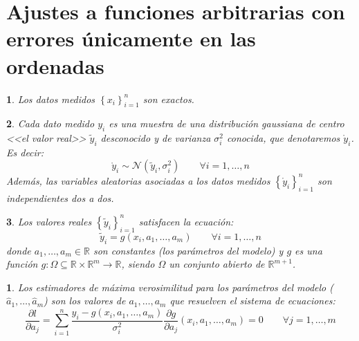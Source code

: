 \documentclass[11pt,a4paper,spanish]{article}
\numberwithin{equation}{section}
\numberwithin{table}{section}
\numberwithin{figure}{section}
\theoremstyle{definition}
\theoremstyle{remark}
\theoremstyle{definition}
\theoremstyle{remark}
\theoremstyle{plain}
\newtheorem{prop}{\protect\propositionname}[section]
\theoremstyle{plain}
\theoremstyle{plain}
\theoremstyle{plain}
\theoremstyle{plain}
\newtheorem{assumption}{\protect\assumptionname}[section]
\theoremstyle{plain}
\providecommand{\assumptionname}{Suposición}
\providecommand{\propositionname}{Proposición}
\begin{document}
	\section{Ajustes a funciones arbitrarias con errores únicamente en las ordenadas}\label{subsec:semigeneral}
	\begin{assumption}
		\label{assu:semigeneral xi exactos}Los datos medidos $\left\{ x_{i}\right\} _{i=1}^{n}$
		son exactos.
	\end{assumption}
	\begin{assumption}
		\label{assu:semigeneral yi}Cada dato medido $y_{i}$ es una muestra
		de una distribución gaussiana de centro <<el valor real>> $\tilde{y}_{i}$
		desconocido y de varianza $\sigma_{i}^{2}$ conocida, que denotaremos
		$\mathring{y}_{i}$. Es decir:
		\[
		\mathring{y}_{i}\sim\mathcal{N}\left(\tilde{y}_{i},\sigma_{i}^{2}\right)\qquad\forall i=1,\dots,n
		\]
		Además, las variables aleatorias asociadas a los datos medidos $\left\{ \mathring{y}_{i}\right\} _{i=1}^{n}$
		son independientes dos a dos.
	\end{assumption}
	\begin{assumption}
		\label{assu:semigeneral yi tilde}Los valores reales $\left\{ \tilde{y}_{i}\right\} _{i=1}^{n}$
		satisfacen la ecuación:
		\[
		\tilde{y}_{i}=g\left(x_{i},a_{1},\dots,a_{m}\right)\qquad\forall i=1,\dots,n
		\]
		donde $a_{1},\dots,a_{m}\in\mathbb{R}$ son constantes (los parámetros
		del modelo) y $g$ es una función $g:\Omega\subseteq\mathbb{R}\times\mathbb{R}^{m}\longrightarrow\mathbb{R}$,
		siendo $\Omega$ un conjunto abierto de $\mathbb{R}^{m+1}$.
	\end{assumption}
	\begin{prop}
		\label{prop:semigeneral m=0000E1xima verosimilitud}Los estimadores
		de máxima verosimilitud para los parámetros del modelo ($\hat{a}_{1},\dots,\hat{a}_{m}$)
		son los valores de $a_{1},\dots,a_{m}$ que resuelven el sistema de
		ecuaciones:
		\[
		\frac{\partial l}{\partial a_{j}}=\sum_{i=1}^{n}\frac{y_{i}-g\left(x_{i},a_{1},\dots,a_{m}\right)}{\sigma_{i}^{2}}\frac{\partial g}{\partial a_{j}}\left(x_{i},a_{1},\dots,a_{m}\right)=0\qquad\forall j=1,\dots,m
		\]
	\end{prop}
\end{document}
